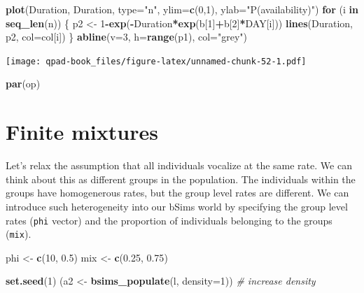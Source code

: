 \documentclass[12pt,]{book}
\newenvironment{Shaded}{\begin{snugshade}}{\end{snugshade}}
\newcommand{\CommentTok}[1]{\textcolor[rgb]{0.56,0.35,0.01}{\textit{#1}}}
\newcommand{\ControlFlowTok}[1]{\textcolor[rgb]{0.13,0.29,0.53}{\textbf{#1}}}
\newcommand{\DataTypeTok}[1]{\textcolor[rgb]{0.13,0.29,0.53}{#1}}
\newcommand{\DecValTok}[1]{\textcolor[rgb]{0.00,0.00,0.81}{#1}}
\newcommand{\FloatTok}[1]{\textcolor[rgb]{0.00,0.00,0.81}{#1}}
\newcommand{\KeywordTok}[1]{\textcolor[rgb]{0.13,0.29,0.53}{\textbf{#1}}}
\newcommand{\NormalTok}[1]{#1}
\newcommand{\OperatorTok}[1]{\textcolor[rgb]{0.81,0.36,0.00}{\textbf{#1}}}
\newcommand{\StringTok}[1]{\textcolor[rgb]{0.31,0.60,0.02}{#1}}
\begin{document}
\begin{Shaded}
\begin{Highlighting}[]
\KeywordTok{plot}\NormalTok{(Duration, Duration, }\DataTypeTok{type=}\StringTok{"n"}\NormalTok{, }\DataTypeTok{ylim=}\KeywordTok{c}\NormalTok{(}\DecValTok{0}\NormalTok{,}\DecValTok{1}\NormalTok{),}
    \DataTypeTok{ylab=}\StringTok{"P(availability)"}\NormalTok{)}
\ControlFlowTok{for}\NormalTok{ (i }\ControlFlowTok{in} \KeywordTok{seq_len}\NormalTok{(n)) \{}
\NormalTok{    p2 <-}\StringTok{ }\DecValTok{1}\OperatorTok{-}\KeywordTok{exp}\NormalTok{(}\OperatorTok{-}\NormalTok{Duration}\OperatorTok{*}\KeywordTok{exp}\NormalTok{(b[}\DecValTok{1}\NormalTok{]}\OperatorTok{+}\NormalTok{b[}\DecValTok{2}\NormalTok{]}\OperatorTok{*}\NormalTok{DAY[i]))}
    \KeywordTok{lines}\NormalTok{(Duration, p2, }\DataTypeTok{col=}\NormalTok{col[i])}
\NormalTok{\}}
\KeywordTok{abline}\NormalTok{(}\DataTypeTok{v=}\DecValTok{3}\NormalTok{, }\DataTypeTok{h=}\KeywordTok{range}\NormalTok{(p1), }\DataTypeTok{col=}\StringTok{"grey"}\NormalTok{)}
\end{Highlighting}
\end{Shaded}

\texttt{[image: qpad-book\_files/figure-latex/unnamed-chunk-52-1.pdf]}

\begin{Shaded}
\begin{Highlighting}[]
\KeywordTok{par}\NormalTok{(op)}
\end{Highlighting}
\end{Shaded}

\hypertarget{finite-mixtures}{%
\section{Finite mixtures}\label{finite-mixtures}}

Let's relax the assumption that all individuals vocalize at the same rate.
We can think about this as different groups in the population.
The individuals within the groups have homogenerous rates,
but the group level rates are different.
We can introduce such heterogeneity into our bSims world by
specifying the group level rates (\texttt{phi} vector) and the
proportion of individuals belonging to the groups (\texttt{mix}).

\begin{Shaded}
\begin{Highlighting}[]
\NormalTok{phi <-}\StringTok{ }\KeywordTok{c}\NormalTok{(}\DecValTok{10}\NormalTok{, }\FloatTok{0.5}\NormalTok{)}
\NormalTok{mix <-}\StringTok{ }\KeywordTok{c}\NormalTok{(}\FloatTok{0.25}\NormalTok{, }\FloatTok{0.75}\NormalTok{)}

\KeywordTok{set.seed}\NormalTok{(}\DecValTok{1}\NormalTok{)}
\NormalTok{(a2 <-}\StringTok{ }\KeywordTok{bsims_populate}\NormalTok{(l, }\DataTypeTok{density=}\DecValTok{1}\NormalTok{)) }\CommentTok{# increase density}
\end{Highlighting}
\end{Shaded}
\end{document}
